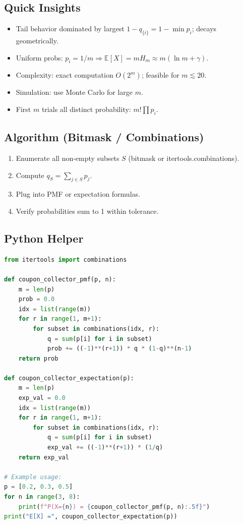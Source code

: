 \documentclass{book}
\begin{document}
\subsection*{Quick Insights}
\begin{itemize}
    \item Tail behavior dominated by largest $1-q_{\{i\}} = 1-\min p_i$; decays geometrically.
    \item Uniform probs: $p_i=1/m \Rightarrow \mathbb E[X]=m H_m \approx m(\ln m+\gamma)$.
    \item Complexity: exact computation $O(2^m)$; feasible for $m\lesssim 20$.
    \item Simulation: use Monte Carlo for large $m$.
    \item First $m$ trials all distinct probability: $m!\prod p_i$.
\end{itemize}

\subsection*{Algorithm (Bitmask / Combinations)}
\begin{enumerate}
    \item Enumerate all non-empty subsets $S$ (bitmask or itertools.combinations).
    \item Compute $q_S = \sum_{j\in S} p_j$.
    \item Plug into PMF or expectation formulas.
    \item Verify probabilities sum to 1 within tolerance.
\end{enumerate}

\subsection*{Python Helper}
\begin{lstlisting}[language=Python]
from itertools import combinations

def coupon_collector_pmf(p, n):
    m = len(p)
    prob = 0.0
    idx = list(range(m))
    for r in range(1, m+1):
        for subset in combinations(idx, r):
            q = sum(p[i] for i in subset)
            prob += ((-1)**(r+1)) * q * (1-q)**(n-1)
    return prob

def coupon_collector_expectation(p):
    m = len(p)
    exp_val = 0.0
    idx = list(range(m))
    for r in range(1, m+1):
        for subset in combinations(idx, r):
            q = sum(p[i] for i in subset)
            exp_val += ((-1)**(r+1)) * (1/q)
    return exp_val

# Example usage:
p = [0.2, 0.3, 0.5]
for n in range(3, 8):
    print(f"P(X={n}) = {coupon_collector_pmf(p, n):.5f}")
print("E[X] =", coupon_collector_expectation(p))
\end{lstlisting}
\end{document}

